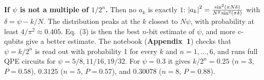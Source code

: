 \documentclass[a4paper, 10pt]{article}
\begin{document}
\begin{solution}
	\myspace

	\noindent \textbf{If \( \psi \) is not a multiple of \( 1/2^n \).} Then no \( a_k \) is exactly \( 1 \): \( \left|a_k\right|^2 = \frac{\sin^2\left(\pi N\delta\right)}{N^2\sin^2\left(\pi\delta\right)} \) with \( \delta = \psi - k/N \). The distribution peaks at the \( k \) closest to \( N\psi \), with probability at least \( 4/\pi^2 \approx 0.405 \). Eq.~(3) is then the best \( n \)-bit estimate of \( \psi \), and more c-qubits give a better estimate.
	The notebook (\textbf{Appendix~1}) checks that \( \psi = k/2^n \) is read out with probability 1 for every \( k \) and \( n = 1, \dots, 6 \), and runs full QPE circuits for \( \psi = 5/8, 11/16, 19/32 \). For \( \psi = 0.3 \) it gives \( k/2^n = 0.25 \) (\( n = 3 \), \( P = 0.58 \)), \( 0.3125 \) (\( n = 5 \), \( P = 0.57 \)), and \( 0.30078 \) (\( n = 8 \), \( P = 0.88 \)).
\end{solution}



\end{document}
